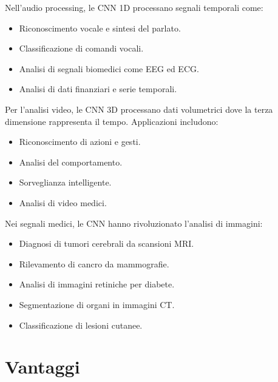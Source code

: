 \documentclass[a4paper,12pt]{report}
\begin{document}
	Nell'audio processing, le CNN 1D processano segnali temporali come:
	\begin{itemize}
		\item Riconoscimento vocale e sintesi del parlato.
		\item Classificazione di comandi vocali.
		\item Analisi di segnali biomedici come EEG ed ECG.
		\item Analisi di dati finanziari e serie temporali.
	\end{itemize}
	Per l'analisi video, le CNN 3D processano dati volumetrici dove la terza dimensione rappresenta il tempo. Applicazioni includono:
	\begin{itemize}
		\item Riconoscimento di azioni e gesti.
		\item Analisi del comportamento.
		\item Sorveglianza intelligente.
		\item Analisi di video medici.
	\end{itemize}
	Nei segnali medici, le CNN hanno rivoluzionato l'analisi di immagini:
	\begin{itemize}
		\item Diagnosi di tumori cerebrali da scansioni MRI.
		\item Rilevamento di cancro da mammografie.
		\item Analisi di immagini retiniche per diabete.
		\item Segmentazione di organi in immagini CT.
		\item Classificazione di lesioni cutanee.
	\end{itemize}
	
	\section{Vantaggi}
	
\end{document}
